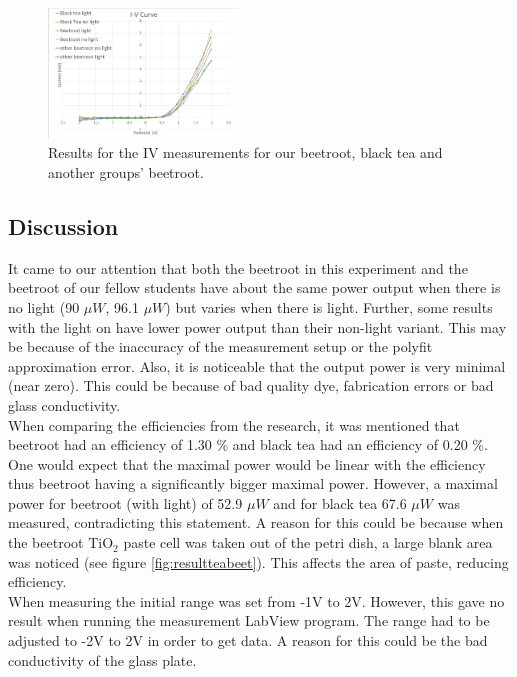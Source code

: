 \documentclass[conference]{IEEEtran}
\begin{document}
 
\begin{figure}[H]
\centering
\includegraphics[width=0.45\textwidth]{IVCURVE.png}
\caption{Results for the IV measurements for our beetroot, black tea and another groups' beetroot.}
\label{fig:redbeetcurve} %
\end{figure}

\subsection{Discussion}

It came to our attention that both the beetroot in this experiment and the beetroot of our fellow students have about the same power output when there is no light (90 $\mu W$, 96.1  $\mu W$) but varies when there is light. Further, some results with the light on have lower power output than their non-light variant. This may be because of the inaccuracy of the measurement setup or the polyfit approximation error. Also, it is noticeable that the output power is very minimal (near zero). This could be because of bad quality dye, fabrication errors or bad glass conductivity.\\

When comparing the efficiencies from the research, it was mentioned that beetroot had an efficiency of 1.30 \% and black tea had an efficiency of 0.20 \%. One would expect that the maximal power would be linear with the efficiency thus beetroot having a significantly bigger maximal power. However,  a maximal power for beetroot (with light) of 52.9 $\mu W$ and for black tea 67.6 $\mu W$ was measured, contradicting this statement. A reason for this could be because when the beetroot TiO$_2$ paste cell was taken out of the petri dish, a large blank area was noticed (see figure \ref{fig:resultteabeet}). This affects the area of paste, reducing efficiency.\\

When measuring the initial range was set from -1V to 2V. However, this gave no result when running the measurement LabView program. The range had to be adjusted to -2V to 2V in order to get data. A reason for this could be the bad conductivity of the glass plate.
\end{document}
